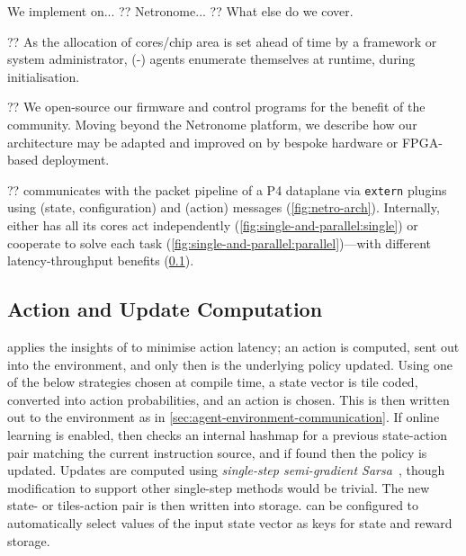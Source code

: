 We implement \approachshort{} on... ?? Netronome...
?? What else do we cover.

?? As the allocation of cores/chip area is set ahead of time by a framework or system administrator, \approachshort{}(-\Coopfw) agents enumerate themselves at runtime, during initialisation.

?? We open-source our firmware and control programs for the benefit of the community.
Moving beyond the Netronome platform, we describe how our architecture may be adapted and improved on by bespoke hardware or FPGA-based deployment.

?? \approachshort{} communicates with the packet pipeline of a P4 dataplane via \texttt{extern} plugins using \inring{} (state, configuration) and \outring{} (action) messages (\cref{fig:netro-arch}).
Internally, \approachshort{} either has all its cores act independently (\cref{fig:single-and-parallel:single}) or cooperate to solve each task (\cref{fig:single-and-parallel:parallel})---with different latency-throughput benefits (\cref{sec:action-and-update-computation}).

\subsection{Action and Update Computation}\label{sec:action-and-update-computation}
\approachshort{} applies the insights of \textcite{DBLP:journals/firai/TravnikMSP18} to minimise action latency; an action is computed, sent out into the environment, and only then is the underlying policy updated.
Using one of the below strategies chosen at compile time, a state vector is tile coded, converted into action probabilities, and an action is chosen.
This is then written out to the environment as in \cref{sec:agent-environment-communication}.
If online learning is enabled, \approachshort{} then checks an internal hashmap for a previous state-action pair matching the current instruction source, and if found then the policy is updated.
Updates are computed using \emph{single-step semi-gradient Sarsa}~\cite[pp. \numrange{217}{221}]{RL2E}, though modification to support other single-step methods would be trivial.
The new state- or tiles-action pair is then written into storage.
\approachshort{} can be configured to automatically select values of the input state vector as keys for state and reward storage.


